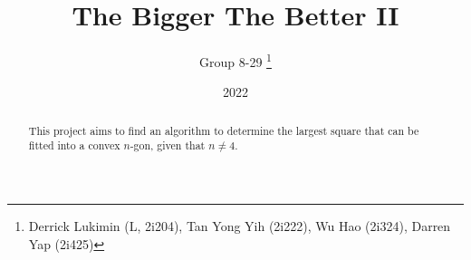 \documentclass[11pt]{article}
\title{The Bigger The Better II}
\author{Group 8-29 \thanks{Derrick Lukimin (L, 2i204), Tan Yong Yih (2i222), Wu Hao (2i324), Darren Yap (2i425)}}
\date{2022}
\begin{document}
\onehalfspacing
\maketitle
\tableofcontents

\begin{abstract}
  This project aims to find an algorithm to determine
  the largest square that can be fitted into a convex
  $n$-gon, given that $n \neq 4$.
\end{abstract}
\end{document}
